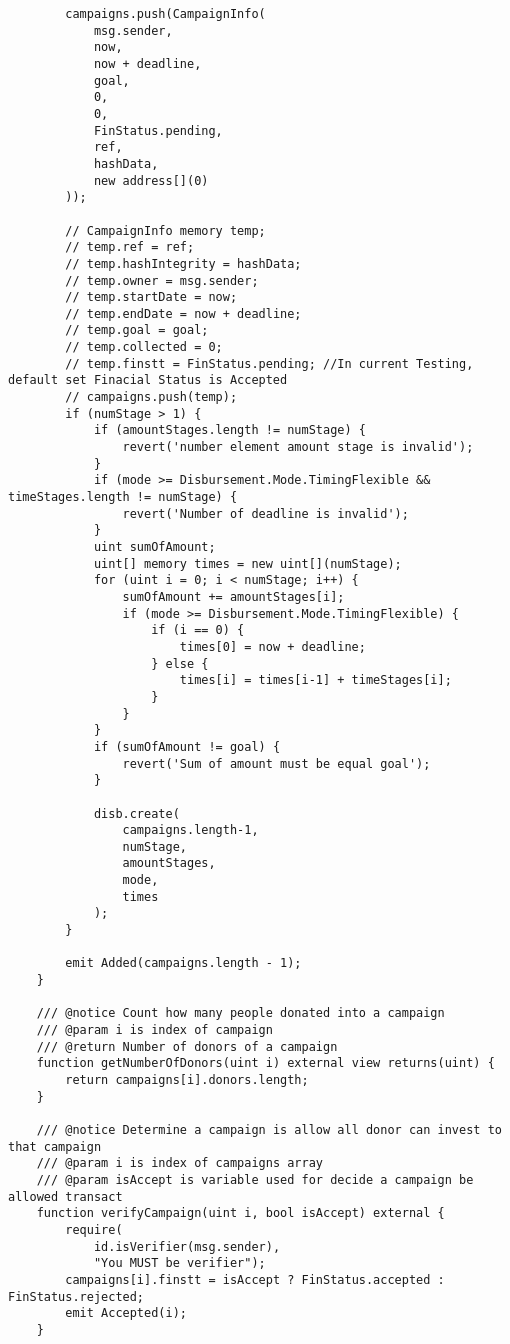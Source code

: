\documentclass[../main-report.tex]{subfiles}
\begin{document}
\begin{lstlisting}
        campaigns.push(CampaignInfo(
            msg.sender,
            now,
            now + deadline,
            goal,
            0,
            0,
            FinStatus.pending,
            ref,
            hashData,
            new address[](0)
        ));

        // CampaignInfo memory temp;
        // temp.ref = ref;
        // temp.hashIntegrity = hashData;
        // temp.owner = msg.sender;
        // temp.startDate = now;
        // temp.endDate = now + deadline;
        // temp.goal = goal;
        // temp.collected = 0;
        // temp.finstt = FinStatus.pending; //In current Testing, default set Finacial Status is Accepted
        // campaigns.push(temp);
        if (numStage > 1) {
            if (amountStages.length != numStage) {
                revert('number element amount stage is invalid');
            }
            if (mode >= Disbursement.Mode.TimingFlexible && timeStages.length != numStage) {
                revert('Number of deadline is invalid');
            }
            uint sumOfAmount;
            uint[] memory times = new uint[](numStage);
            for (uint i = 0; i < numStage; i++) {
                sumOfAmount += amountStages[i];
                if (mode >= Disbursement.Mode.TimingFlexible) {
                    if (i == 0) {
                        times[0] = now + deadline;
                    } else {
                        times[i] = times[i-1] + timeStages[i];
                    }
                }
            }
            if (sumOfAmount != goal) {
                revert('Sum of amount must be equal goal');
            }

            disb.create(
                campaigns.length-1,
                numStage,
                amountStages,
                mode,
                times
            );
        }

        emit Added(campaigns.length - 1);
    }

    /// @notice Count how many people donated into a campaign
    /// @param i is index of campaign
    /// @return Number of donors of a campaign
    function getNumberOfDonors(uint i) external view returns(uint) {
        return campaigns[i].donors.length;
    }

    /// @notice Determine a campaign is allow all donor can invest to that campaign
    /// @param i is index of campaigns array
    /// @param isAccept is variable used for decide a campaign be allowed transact
    function verifyCampaign(uint i, bool isAccept) external {
        require(
            id.isVerifier(msg.sender),
            "You MUST be verifier");
        campaigns[i].finstt = isAccept ? FinStatus.accepted : FinStatus.rejected;
        emit Accepted(i);
    }


\end{lstlisting}
\end{document}
